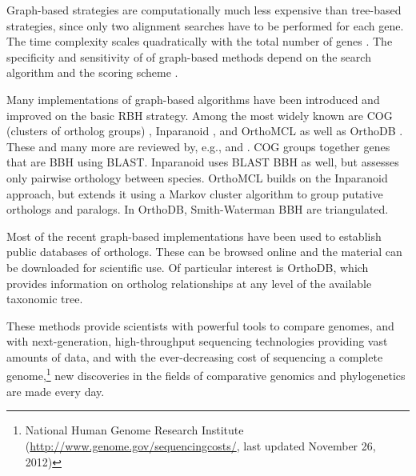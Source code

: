 

Graph-based strategies are computationally much less expensive than tree-based
strategies, since only two alignment searches have to be performed for each
gene. The time complexity scales quadratically with the total number of genes
\citep{altenhoff2012-1}.  The specificity and sensitivity of of graph-based
methods depend on the search algorithm and the scoring scheme
\citep{hulsen2006}.

Many implementations of graph-based algorithms have been introduced and improved
on the basic RBH strategy. Among the most widely known are COG (clusters of
ortholog groups) \citep{tatusov2003}, Inparanoid \citep{ostlund2010}, and
OrthoMCL \citep{li2003} as well as OrthoDB \citep{waterhouse2011}. These and
many more are reviewed by, e.g., \citet{kuzniar2008} and \citet{forslund2011}.
COG groups together genes that are BBH using BLAST. Inparanoid uses BLAST BBH as
well, but assesses only pairwise orthology between species. OrthoMCL builds on
the Inparanoid approach, but extends it using a Markov cluster algorithm to
group putative orthologs and paralogs. In OrthoDB, Smith-Waterman BBH are
triangulated.

Most of the recent graph-based implementations have been used to establish
public databases of orthologs. These can be browsed online and the material can
be downloaded for scientific use. Of particular interest is OrthoDB, which
provides information on ortholog relationships at any level of the available
taxonomic tree. 

These methods provide scientists with powerful tools to compare genomes, and
with next-generation, high-throughput sequencing technologies providing vast
amounts of data, and with the ever-decreasing cost of sequencing a complete
genome,\footnote{National Human Genome Research Institute
(\url{http://www.genome.gov/sequencingcosts/}, last updated November 26, 2012)}
new discoveries in the fields of comparative genomics and phylogenetics are made
every day. 

